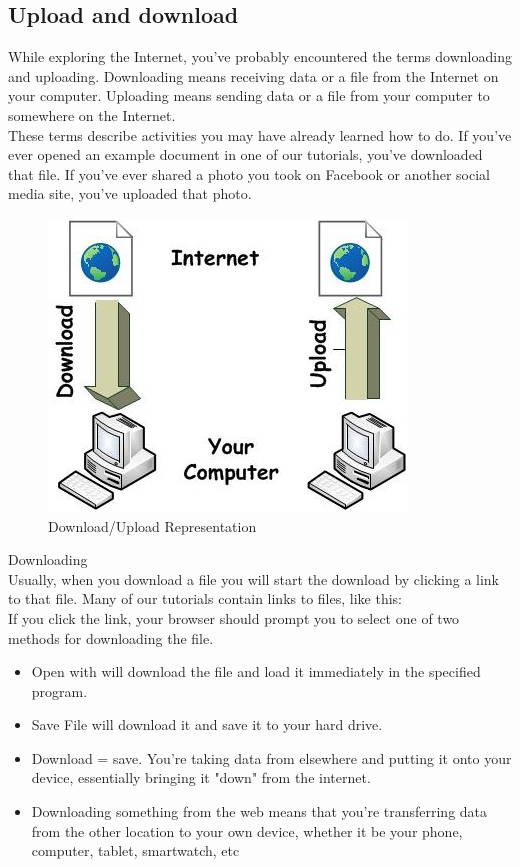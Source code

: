 \documentclass[11pt,a4paper,twoside]{article}
\begin{document}
\subsection{Upload and download}
While exploring the Internet, you’ve probably encountered the terms downloading and uploading. Downloading means receiving data or a file from the Internet on your computer. Uploading means sending data or a file from your computer to somewhere on the Internet.\\
These terms describe activities you may have already learned how to do. If you've ever opened an example document in one of our tutorials, you've downloaded that file. If you’ve ever shared a photo you took on Facebook or another social media site, you've uploaded that photo.
\begin{figure}[H]
\centering \includegraphics[scale=1]{Fig 36.jpg}
\caption{Download/Upload Representation}
\end{figure}
\noindent Downloading\\
Usually, when you download a file you will start the download by clicking a link to that file. Many of our tutorials contain links to files, like this:\\
If you click the link, your browser should prompt you to select one of two methods for downloading the file.
\begin{itemize}
\item Open with will download the file and load it immediately in the specified program.
\item Save File will download it and save it to your hard drive.
\item Download = save. You're taking data from elsewhere and putting it onto your device, essentially bringing it "down" from the internet.
\item Downloading something from the web means that you're transferring data from the other location to your own device, whether it be your phone, computer, tablet, smartwatch, etc
\end{itemize}
\end{document}
